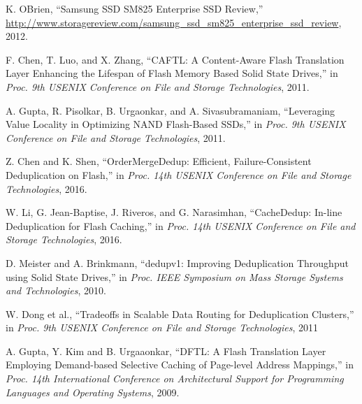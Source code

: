 \begin{thebibliography}{00}
K. OBrien,
``Samsung SSD SM825 Enterprise SSD Review,''
\url{http://www.storagereview.com/samsung_ssd_sm825_enterprise_ssd_review}, 2012.

F. Chen, T. Luo, and X. Zhang, 
``CAFTL: A Content-Aware Flash Translation Layer Enhancing the Lifespan of Flash Memory Based Solid State Drives,''
in \textit{Proc. 9th USENIX Conference on File and Storage Technologies}, 2011.

A. Gupta, R. Pisolkar, B. Urgaonkar, and A. Sivasubramaniam,
``Leveraging Value Locality in Optimizing NAND Flash-Based SSDs,''
in \textit{Proc. 9th USENIX Conference on File and Storage Technologies}, 2011.

Z. Chen and K. Shen, 
``OrderMergeDedup: Efficient, Failure-Consistent Deduplication on Flash,'' 
in \textit{Proc. 14th USENIX Conference on File and Storage Technologies}, 2016.

W. Li, G. Jean-Baptise, J. Riveros, and G. Narasimhan, 
``CacheDedup: In-line Deduplication for Flash Caching,''
in \textit{Proc. 14th USENIX Conference on File and Storage Technologies}, 2016.

D. Meister and A. Brinkmann,
``dedupv1: Improving Deduplication Throughput using Solid State Drives,''
in \textit{Proc. IEEE Symposium on Mass Storage Systems and Technologies}, 2010.

W. Dong et al.,
``Tradeoffs in Scalable Data Routing for Deduplication Clusters,''
in \textit{Proc. 9th USENIX Conference on File and Storage Technologies}, 2011


A. Gupta, Y. Kim and B. Urgaaonkar, 
``DFTL: A Flash Translation Layer Employing Demand-based Selective Caching of Page-level Address Mappings,''
in \textit{Proc. 14th International Conference on Architectural Support for Programming Languages and
Operating Systems}, 2009.





\end{thebibliography}
